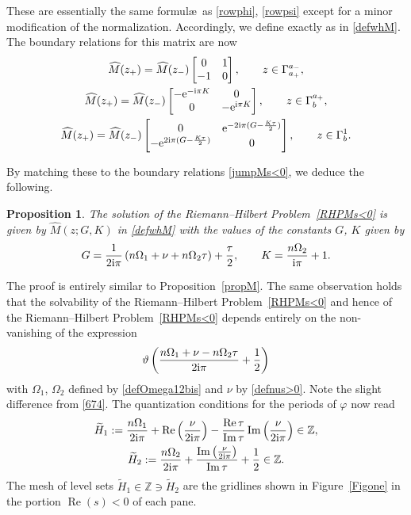 \documentclass[pdftex]{sigma}
\numberwithin{equation}{section}
\newtheorem{Proposition}[Theorem]{Proposition}
\theoremstyle{definition}
\def\le{\left}
\def\ri{\right}
\def \wt{ \widetilde }
\def \wh{\widehat}
\def\be{\begin{equation}}
\def\ee{\end{equation}}
\def\Z{{\mathbb Z}}
\def \Re{\operatorname{Re} }
\def \Im {\operatorname{Im} }
\begin{document}
These are essentially the same formul\ae\ as \eqref{rowphi}, \eqref{rowpsi} except for a minor modification of the normalization.
Accordingly, we define \smash{$\wh M(z;G,K,\infty)$} exactly as in \eqref{defwhM}.
The boundary relations for this matrix \smash{$\wh M$} are now
\begin{gather*}%
\wh M(z_+)= \wh M(z_-) \begin{bmatrix}
0 & 1 \\
-1 & 0
\end{bmatrix},\qquad z\in \Gamma_{a_+}^{a_-},
\\
\wh M(z_+)= \wh M(z_-)
\begin{bmatrix}
-{\rm e}^{-{\rm i}\pi K} & 0 \\
0 & -{\rm e}^{{\rm i}\pi K}
\end{bmatrix},
\qquad z\in \Gamma_b^{a_+},
\\
\wh M(z_+)= \wh M(z_-) \begin{bmatrix}
0 & {\rm e}^{-2{\rm i}\pi(G - \frac {K\tau}2) }\\
-{\rm e}^{2{\rm i}\pi(G - \frac {K\tau}2) }& 0
\end{bmatrix},\qquad z\in \Gamma_b^{1}.
\end{gather*}

By matching these to the boundary relations \eqref{jumpMs<0}, we deduce the following.
\begin{Proposition}\label{propM<0}
The solution of the Riemann--Hilbert Problem~{\rm\ref{RHPMs<0}} is given by $\wh M(z;G,K)$ in \eqref{defwhM} with the values of the constants $G$, $K$ given by
\be
\label{defGs<0}
G= \frac 1{2{\rm i}\pi} \le(n\Omega_1 + \nu + n \Omega_2\tau\ri) + \frac {\tau}2,\qquad
K = \frac {n\Omega_2}{{\rm i}\pi} + 1.
\ee
\end{Proposition}
The proof is entirely similar to Proposition~\ref{propM}.
The same observation holds that the solvability of the Riemann--Hilbert Problem~\ref{RHPMs<0} and hence of the Riemann--Hilbert Problem~\ref{RHPMs<0} depends entirely on the non-vanishing of the expression
\be
\label{meshs<0}
\vartheta\le(\frac {n\Omega_1 + \nu - n \Omega_2\tau }{2{\rm i}\pi} + \frac 12 \ri)
\ee
with $\Omega_1$, $\Omega_2$ defined by \eqref{defOmega12bis} and $\nu$ by \eqref{defnus>0}. Note the slight difference from \eqref{674}.
The quantization conditions for the periods of $\varphi$ now read
\begin{gather}
\wt H_1:= \frac{n\Omega_1}{2{\rm i}\pi} + \Re\le(\frac {\nu} {2{\rm i}\pi} \ri) - \frac {\Re \tau}{\Im\tau} \Im\le(\frac {\nu}{2{\rm i}\pi}\ri) \in \Z,\nonumber
\\
\wt H_2:= \frac{n\Omega_2}{2{\rm i}\pi} + \frac {\Im\le(\frac{\nu}{2{\rm i}\pi}\ri)}{\Im \tau} + \frac 1 2 \in \Z.\label{quantcond<0}
\end{gather}
The mesh of level sets $ \wt H_1\in \Z \ni \wt H_2$ are the gridlines shown in Figure~\ref{Figone} in the portion $\Re (s)<0$ of each pane.
%
\end{document}
